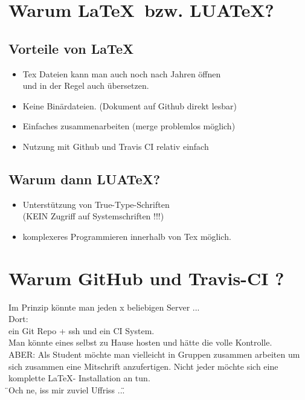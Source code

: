\section{Warum \LaTeX \  bzw. LUA\TeX ?}
\subsection{Vorteile von \LaTeX}
\begin{itemize}
  \item Tex Dateien kann man auch noch nach Jahren öffnen \\und in der Regel auch übersetzen.
  \item Keine Binärdateien. (Dokument auf Github direkt lesbar)
  \item Einfaches zusammenarbeiten (merge problemlos möglich)
  \item Nutzung mit Github und Travis CI relativ einfach
\end{itemize}
\subsection{Warum dann LUA\TeX ?}
\begin{itemize}
  \item Unterstützung von True-Type-Schriften \\(KEIN Zugriff auf Systemschriften !!!)
  \item komplexeres Programmieren innerhalb von Tex möglich.
\end{itemize}


\section{Warum GitHub und Travis-CI ?}

Im Prinzip könnte man jeden x beliebigen Server ... \\
Dort: \\
ein Git Repo + ssh und ein CI System. \\

Man könnte eines selbst zu Hause hosten und hätte die volle Kontrolle.\\

ABER:
Als Student möchte man vielleicht in Gruppen zusammen arbeiten um sich zusammen eine Mitschrift anzufertigen.
Nicht jeder möchte sich eine komplette \LaTeX - Installation an tun.\\

\"{}Och ne, iss mir zuviel Uffriss ...\"{} \\

